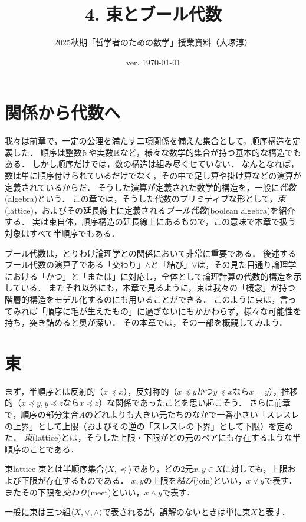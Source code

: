 \documentclass[11pt,a4paper, dvipdfmx]{jsarticle}
\begin{document}
\title{4. 束とブール代数}
\author{2025秋期「哲学者のための数学」授業資料（大塚淳）}
\date{ver. \today}
\maketitle

\section{関係から代数へ}
我々は前章で，一定の公理を満たす二項関係を備えた集合として，順序構造を定義した．
順序は整数$\mathbb{N}$や実数$\mathbb{R}$など，様々な数学的集合が持つ基本的な構造でもある．
しかし順序だけでは，数の構造は組み尽くせていない．
なんとなれば，数は単に順序付けられているだけでなく，その中で足し算や掛け算などの演算が定義されているからだ．
そうした演算が定義された数学的構造を，一般に\emph{代数}(algebra)という．
この章では，そうした代数のプリミティブな形として，\emph{束}(lattice)，およびその延長線上に定義される\emph{ブール代数}(boolean algebra)を紹介する．
実は束自体，順序構造の延長線上にあるもので，この意味で本章で扱う対象はすべて半順序でもある．

ブール代数は，とりわけ論理学との関係において非常に重要である．
後述するブール代数の演算子である「交わり」$\wedge$と「結び」$\vee$は，その見た目通り論理学における「かつ」と「または」に対応し，全体として論理計算の代数的構造を示している．
またそれ以外にも，本章で見るように，束は我々の「概念」が持つ階層的構造をモデル化するのにも用いることができる．
このように束は，言ってみれば「順序に毛が生えたもの」に過ぎないにもかかわらず，様々な可能性を持ち，突き詰めると奥が深い．
その本章では，その一部を概観してみよう．

\section{束}

まず，半順序とは反射的（$x \preceq x$），反対称的（$x \preceq y$かつ$y \preceq x$なら$x=y$），推移的（$x \preceq y, y \preceq z$なら$x \preceq z$）な関係であったことを思い起こそう．
さらに前章で，順序の部分集合$A$のどれよりも大きい元たちのなかで一番小さい「スレスレの上界」として上限（およびその逆の「スレスレの下界」として下限）を定めた．
\emph{束}(lattice)とは，そうした上限・下限がどの元のペアにも存在するような半順序のことである．

\begin{dfn}{束}{lattice}
束とは半順序集合$\langle X, \preceq \rangle$であり，どの2元$x, y \in X$に対しても，上限および下限が存在するものである．
$x, y$の上限を\emph{結び}(join)といい，$x \vee y$で表す．またその下限を\emph{交わり}(meet)といい，$x \wedge y$で表す．

一般に束は三つ組$\langle X, \vee, \wedge \rangle$で表されるが，誤解のないときは単に束$X$と表す．
\end{dfn}
\end{document}
